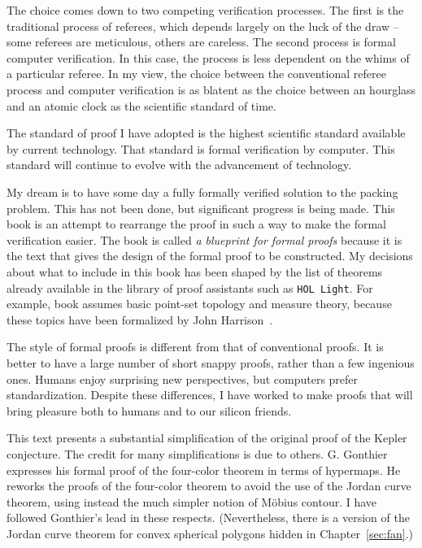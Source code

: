 The choice comes down to two competing verification processes.  The first is the traditional
process of referees, which depends largely on the luck of the draw
-- some referees are meticulous, others are careless.   The second
process is formal computer verification. In this case, the process
is less dependent on the whims of a particular referee.
In my view, the choice between the conventional referee process and
computer verification is as blatent as the choice between an
hourglass and an atomic clock as the scientific standard of time.

The standard of proof I have adopted is the highest scientific standard
available by current technology.  That 
standard is formal verification by computer.  This standard will
continue to evolve with the advancement of technology.

My dream is to have some day a fully formally verified solution to
the packing problem.
This has not been done, but significant progress is being
made.  This book is an attempt to rearrange the proof
in such a way to make the formal verification easier.  The book is called {\it a blueprint for formal proofs} because it is the text that gives the design of the formal proof to be constructed.  My decisions about what to include in this book has been shaped by the list of theorems already available in the library of proof assistants such as {\tt HOL Light}.  For example, book assumes basic point-set topology and measure theory, because these topics have been formalized by John Harrison~\cite{unknown}.  

The style of formal proofs is different from that of
conventional proofs.  It is better to have a large number of short
snappy proofs, rather than a few ingenious ones.  Humans enjoy
surprising new perspectives, but computers prefer standardization.
Despite these differences, I have worked to make proofs that
will bring pleasure both to humans and to our silicon friends.

This text presents a substantial simplification of the original proof of the Kepler conjecture.  The credit for many simplifications is due to others.  G. Gonthier expresses his formal proof of the four-color theorem in terms of hypermaps.  He reworks the proofs of the four-color theorem to avoid the use of the Jordan curve theorem, using instead the much simpler notion of M\"obius contour.  I have followed Gonthier's lead in these respects.  (Nevertheless, there is a version of the Jordan curve theorem for convex spherical polygons hidden in Chapter~\ref{sec:fan}.)  


